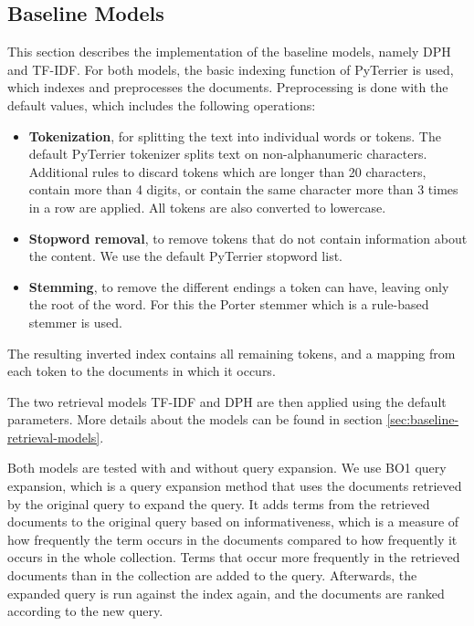 \subsection{Baseline Models}
This section describes the implementation of the baseline models, namely DPH and TF-IDF.
For both models, the basic indexing function of PyTerrier is used, which indexes and preprocesses the documents.
Preprocessing is done with the default values, which includes the following operations:
\begin{itemize}
    \item{\textbf{Tokenization}, for splitting the text into individual words or tokens. The default PyTerrier tokenizer splits text on non-alphanumeric characters. Additional rules to discard tokens which are longer than 20 characters, contain more than 4 digits, or contain the same character more than 3 times in a row are applied. All tokens are also converted to lowercase.}
    \item \textbf{Stopword removal}, to remove tokens that do not contain information about the content. We use the default PyTerrier stopword list.
    \item \textbf{Stemming}, to remove the different endings a token can have, leaving only the root of the word. For this the Porter stemmer which is a rule-based stemmer is used.
\end{itemize}
The resulting inverted index contains all remaining tokens, and a mapping from each token to the documents in which it occurs.

The two retrieval models TF-IDF and DPH are then applied using the default parameters.
More details about the models can be found in section \ref{sec:baseline-retrieval-models}.


Both models are tested with and without query expansion.
We use BO1 query expansion, which is a query expansion method that uses the documents retrieved by the original query to expand the query.
It adds terms from the retrieved documents to the original query based on informativeness, which is a measure of how frequently the term occurs in the documents compared to how frequently it occurs in the whole collection.
Terms that occur more frequently in the retrieved documents than in the collection are added to the query.
Afterwards, the expanded query is run against the index again, and the documents are ranked according to the new query.



